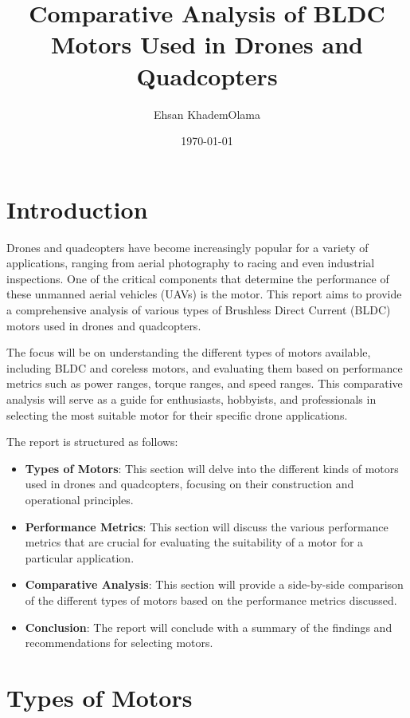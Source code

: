 \documentclass[12pt]{article}
\title{Comparative Analysis of BLDC Motors Used in Drones and Quadcopters}
\author{Ehsan KhademOlama}
\date{\today}
\begin{document}
	
	\maketitle
	
	\tableofcontents
	
	\newpage
	
	\section{Introduction}
	
	Drones and quadcopters have become increasingly popular for a variety of applications, ranging from aerial photography to racing and even industrial inspections. One of the critical components that determine the performance of these unmanned aerial vehicles (UAVs) is the motor. This report aims to provide a comprehensive analysis of various types of Brushless Direct Current (BLDC) motors used in drones and quadcopters. 
	
	The focus will be on understanding the different types of motors available, including BLDC and coreless motors, and evaluating them based on performance metrics such as power ranges, torque ranges, and speed ranges. This comparative analysis will serve as a guide for enthusiasts, hobbyists, and professionals in selecting the most suitable motor for their specific drone applications.
	
	The report is structured as follows:
	\begin{itemize}
		\item \textbf{Types of Motors}: This section will delve into the different kinds of motors used in drones and quadcopters, focusing on their construction and operational principles.
		
		\item \textbf{Performance Metrics}: This section will discuss the various performance metrics that are crucial for evaluating the suitability of a motor for a particular application.
		
		\item \textbf{Comparative Analysis}: This section will provide a side-by-side comparison of the different types of motors based on the performance metrics discussed.
		
		\item \textbf{Conclusion}: The report will conclude with a summary of the findings and recommendations for selecting motors.
	\end{itemize}
	
	\section{Types of Motors}
	
\end{document}
